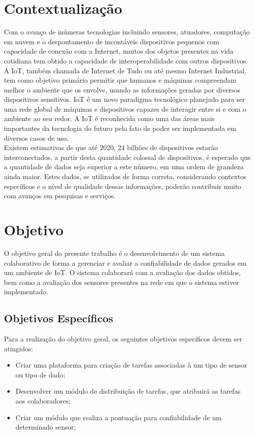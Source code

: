 \section{Contextualização}
\qquad
Com o avanço de inúmeras tecnologias incluindo sensores, atuadores, computação em nuvem e o despontamento de
incontáveis dispositivos pequenos com capacidade de conexão com a Internet, muitos dos objetos presentes
na vida cotidiana tem obtido a capacidade de interoperabilidade com outros dispositivos.
\\ \null
\qquad
A \acrfull{IoT}, também chamada de Internet de Tudo ou até mesmo Internet Industrial, tem como objetivo primário
permitir que humanos e máquinas compreendam melhor o ambiente que os envolve, usando as informações geradas por
diversos dispositivos sensitivos. \acrshort{IoT} é um novo paradigma tecnológico planejado para ser uma rede
global de máquinas e dispositivos capazes de interagir entre si e com o ambiente ao seu redor.
A \acrshort{IoT} é reconhecida como uma das áreas mais importantes da tecnologia do futuro pelo fato de
poder ser implementada em diversos casos de uso.
\\ \null
\qquad Existem estimativas de que até 2020, 24 bilhões de dispositivos estarão interconectados, a partir desta quantidade
colossal de dispositivos, é esperado que a quantidade de dados seja superior a este número, em uma ordem de grandeza ainda maior.
Estes dados, se utilizados de forma correta, considerando contextos específicos e o nível de qualidade dessas informações, poderão
contribuir muito com avanços em pesquisas e serviços.
\section{Objetivo}
\qquad O objetivo geral do presente trabalho é o desenvolvimento de um sistema colaborativo de forma a gerenciar e avaliar a confiabilidade de dados
gerados em um ambiente de \acrlong{IoT}. O sistema colaborará com a avaliação dos dados obtidos, bem como a avaliação
dos sensores presentes na rede em que o sistema estiver implementado.
\subsection{Objetivos Específicos}
Para a realização do objetivo geral, os seguintes objetivos específicos devem ser atingidos:
\begin{itemize}
  \item Criar uma plataforma para criação de tarefas associadas à um tipo de sensor ou tipo de dado;
  \item Desenvolver um módulo de distribuição de tarefas, que atribuirá as tarefas aos colaboradores;
  \item Criar um módulo que realiza a pontuação para confiabilidade de um determinado sensor;
\end{itemize}
